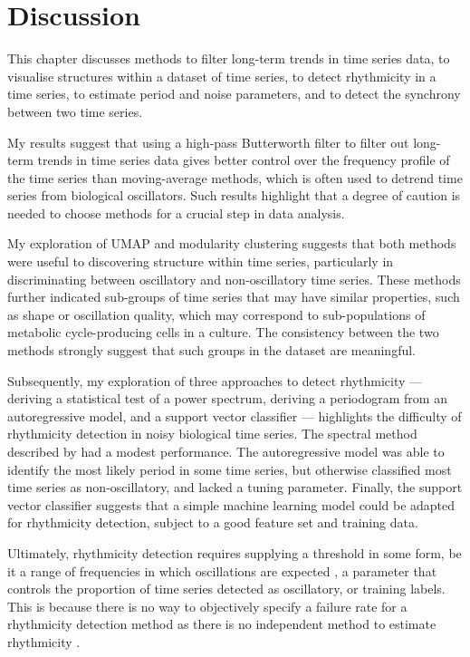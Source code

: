 \section{Discussion}
\label{sec:analysis-discussion}

This chapter discusses methods to filter long-term trends in time series data, to visualise structures within a dataset of time series, to detect rhythmicity in a time series, to estimate period and noise parameters, and to detect the synchrony between two time series.

My results suggest that using a high-pass Butterworth filter to filter out long-term trends in time series data gives better control over the frequency profile of the time series than moving-average methods, which is often used to detrend time series from biological oscillators.
Such results highlight that a degree of caution is needed to choose methods for a crucial step in data analysis.

My exploration of UMAP and modularity clustering suggests that both methods were useful to discovering structure within time series, particularly in discriminating between oscillatory and non-oscillatory time series.
These methods further indicated sub-groups of time series that may have similar properties, such as shape or oscillation quality, which may correspond to sub-populations of metabolic cycle-producing cells in a culture.
The consistency between the two methods strongly suggest that such groups in the dataset are meaningful.

Subsequently, my exploration of three approaches to detect rhythmicity --- deriving a statistical test of a power spectrum, deriving a periodogram from an autoregressive model, and a support vector classifier --- highlights the difficulty of rhythmicity detection in noisy biological time series.
The spectral method described by \parencite{glynnDetectingPeriodicPatterns2006a} had a modest performance.
The autoregressive model was able to identify the most likely period in some time series, but otherwise classified most time series as non-oscillatory, and lacked a tuning parameter.
Finally, the support vector classifier suggests that a simple machine learning model could be adapted for rhythmicity detection, subject to a good feature set and training data.

Ultimately, rhythmicity detection requires supplying a threshold in some form, be it a range of frequencies in which oscillations are expected \parencite{zielinskiStrengthsLimitationsPeriod2014}, a parameter that controls the proportion of time series detected as oscillatory, or training labels.
This is because there is no way to objectively specify a failure rate for a rhythmicity detection method as there is no independent method to estimate rhythmicity \parencite{zielinskiStrengthsLimitationsPeriod2014}.

